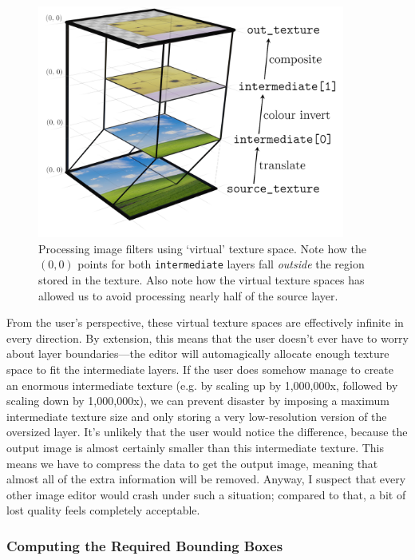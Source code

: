 \documentclass[12pt]{article}
\begin{document}
\begin{figure}
    \begin{center}
        \includegraphics[width=0.9\textwidth]{filter-stacking}
    \end{center}
    \caption{Processing image filters using `virtual' texture space.  Note how the $(0, 0)$ points
    for both \texttt{intermediate} layers fall \emph{outside} the region stored in the
    texture.  Also note how the virtual texture spaces has allowed us to avoid processing nearly
    half of the source layer.}\label{fig:virt-tex-space}
\end{figure}

From the user's perspective, these virtual texture spaces are effectively infinite in every
direction.  By extension, this means that the user doesn't ever have to worry about layer
boundaries---the editor will automagically allocate enough texture space to fit the intermediate
layers.  If the user does somehow manage to create an enormous intermediate texture (e.g. by
scaling up by 1,000,000x, followed by scaling down by 1,000,000x), we can prevent disaster by
imposing a maximum intermediate texture size and only storing a very low-resolution version of the
oversized layer.  It's unlikely that the user would notice the difference, because the output
image is almost certainly smaller than this intermediate texture.  This means we have to compress
the data to get the output image, meaning that almost all of the extra information will be removed.
Anyway, I suspect that every other image editor would crash under such a situation; compared to
that, a bit of lost quality feels completely acceptable.

\subsubsection{Computing the Required Bounding Boxes}
\end{document}
